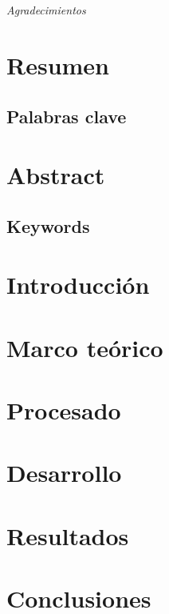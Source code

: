 \documentclass[a4paper, twoside, 11pt]{report}
\begin{document}



\chapter*{}
\thispagestyle{empty}
\begin{flushright}
\textit{Agradecimientos}
\end{flushright}

\chapter*{Resumen} %
\lipsum[0-2]
\section*{Palabras clave}
\lipsum[1][1]

\chapter*{Abstract} %
\lipsum[0-2]
\section*{Keywords}
\lipsum[1][1]

{
\hypersetup{
    linkcolor=black
}
\setlength{\parskip}{0pt}

\tableofcontents
\newpage
\listoffigures
\newpage
\listoftables
}

\chapter{Introducción} \label{ch:introduccion}

\chapter{Marco teórico}

\chapter{Procesado}

\chapter{Desarrollo}

\chapter{Resultados}

\chapter{Conclusiones}


\newpage


\appendix
\clearpage
\addappheadtotoc
\appendixpage
\end{document}
